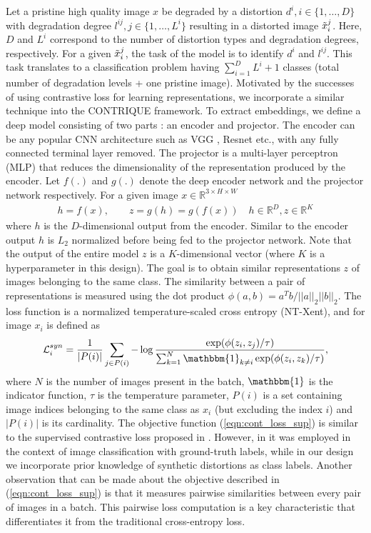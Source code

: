\documentclass[journal]{IEEEtran}
\begin{document}
Let a pristine high quality image $x$ be degraded by a distortion $d^i, i \in \{1,\ldots ,D\}$ with degradation degree $l^{ij}, j \in \{1,\ldots,L^i\}$ resulting in a distorted image $\Tilde{x}^{j}_i$. Here, $D$ and $L^i$ correspond to the number of distortion types and degradation degrees, respectively. For a given $\Tilde{x}^{j}_i$, the task of the model is to identify $d^i$ and $l^{ij}$. This task translates to a classification problem having $\sum_{i=1} ^D L^i + 1$ classes (total number of degradation levels + one pristine image). Motivated by the successes of using contrastive loss \cite{chen2020simple,he2020momentum} for learning representations, we incorporate a similar technique into the CONTRIQUE framework. To extract embeddings, we define a deep model consisting of two parts : an encoder and projector. The encoder can be any popular CNN architecture such as VGG \cite{simonyan2014very}, Resnet \cite{he2016deep} etc., with any fully connected terminal layer removed. The projector is a multi-layer perceptron (MLP) that reduces the dimensionality of the representation produced by the encoder. Let $f(.)$ and $g(.)$ denote the deep encoder network and the projector network respectively. For a given image $x \in \mathbb{R}^{3 \times H\times W}$
\begin{align}
    h = f(x), \qquad z = g(h) = g(f(x)) \quad h \in \mathbb{R}^D, z \in \mathbb{R}^K
\end{align}
where $h$ is the $D$-dimensional output from the encoder. Similar to \cite{chen2020simple,he2020momentum} the encoder output $h$ is $L_2$ normalized before being fed to the projector network. Note that the output of the entire model $z$ is a $K$-dimensional vector (where $K$ is a hyperparameter in this design). The goal is to obtain similar representations $z$ of images belonging to the same class. The similarity between a pair of representations is measured using the dot product $\phi(a,b) = a^T b/||a||_2 ||b||_2$. The loss function is a normalized temperature-scaled cross entropy (NT-Xent), and for image $x_i$ is defined as 
\begin{align}
    \mathcal{L}_i ^{syn} = \frac{1}{|P(i)|} \sum_{j \in P(i)} -\log \frac{\exp(\phi(z_i,z_j)/\tau)}{\sum_{k=1}^N \mathbbm{1}_{k \neq i}\exp(\phi(z_i,z_k)/\tau)},
    \label{eqn:cont_loss_sup}
\end{align}
where $N$ is the number of images present in the batch, $\mathbbm{1}$ is the indicator function, $\tau$ is the temperature parameter, $P(i)$ is a set containing image indices belonging to the same class as $x_i$ (but excluding the index $i$) and $|P(i)|$ is its cardinality. The objective function (\ref{eqn:cont_loss_sup}) is similar to the supervised contrastive loss proposed in \cite{khosla2020supervised}. However, in \cite{khosla2020supervised} it was employed in the context of image classification with ground-truth labels, while in our design we incorporate prior knowledge of synthetic distortions as class labels. Another observation that can be made about the objective described in (\ref{eqn:cont_loss_sup}) is that it measures pairwise similarities between every pair of images in a batch. This pairwise loss computation is a key characteristic that differentiates it from the traditional cross-entropy loss.
\end{document}
